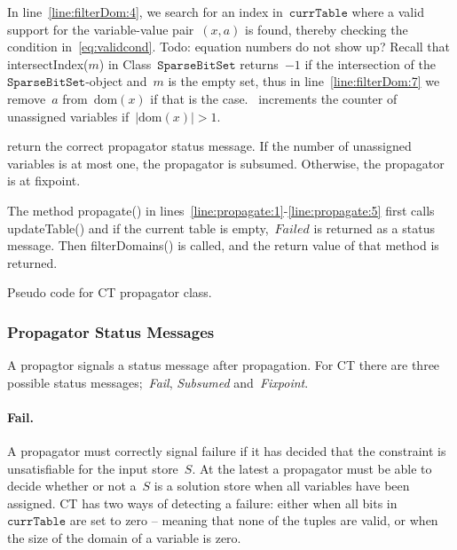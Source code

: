 \documentclass[a4paper,11pt]{article}
\newcommand{\Todo}[1]{{\color{blue}Todo: #1}}
\newcommand{\Dom}[1]{\text{dom}({#1})}
\newcommand{\SparseBitSet}{\texttt{SparseBitSet}}
\newcommand{\CurrTable}{\texttt{currTable}}
\begin{document}
\begin{enumerate}
  In line~\ref{line:filterDom:4}, we search for an index in~$\CurrTable$
  where a valid support for the variable-value pair~$(x,a)$ is found, 
  thereby checking the condition in~\ref{eq:validcond}.
  \Todo{equation numbers do not show up?}
  Recall that intersectIndex($m$) in Class~$\SparseBitSet$ returns~$-1$ if
  the intersection of the~$\SparseBitSet$-object and~$m$ is the empty set,
  thus in line~\ref{line:filterDom:7} we remove~$a$ from~$\Dom{x}$ if that
  is the case.~ increments the
  counter of unassigned variables if~$|\Dom{x}| > 1$.

   return the correct
  propagator status message. If the number of unassigned variables is
  at most one, the propagator is subsumed. Otherwise, the propagator
  is at fixpoint.
  
\end{enumerate}

The method propagate() in lines~\ref{line:propagate:1}-\ref{line:propagate:5}
first calls updateTable() and if the current table is empty,~$Failed$
is returned as a status message. Then filterDomains() is called, and the
return value of that method is returned.

 \begin{algorithm}[h]
  \begin{algorithmic}[1]  %
    
    \end{algorithmic}
  \caption{Pseudo code for CT propagator class.}
  \label{algo:CT}
\end{algorithm}

\subsubsection{Propagator Status Messages}
A propagtor signals a status message after propagation.
For CT there are three possible status messages;~\emph{Fail},
\emph{Subsumed} and~\emph{Fixpoint}.

\paragraph{Fail.}
A propagator must correctly signal failure
if it has decided that the constraint is unsatisfiable for the input store~$S$.
At the latest a propagator must be
able to decide whether or not a~$S$ is a solution store when all
variables have been assigned.
CT has two ways of detecting a failure: either when all bits in~$\CurrTable$
are set to zero -- meaning that none of the tuples are valid, or when the
size of the domain of a variable is zero.
\end{document}
